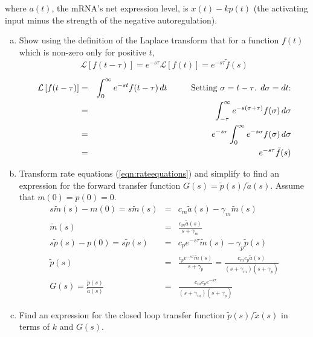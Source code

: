 \documentclass{article}
\begin{document}
\noindent where $a(t)$, the mRNA's net expression level, is $x(t)-k p(t)$ (the activating input minus the strength of the negative autoregulation).

\begin{enumerate}[a)]
\setlength{\itemsep}{0pt}
\item Show using the definition of the Laplace transform that for a function $f(t)$ which is non-zero only for positive $t$,
\[ \mathcal{L}\left[f(t-\tau)\right] = e^{-s\tau} \mathcal{L}\left[f(t)\right] = e^{-s\tau} \tilde{f}(s)\]

{\color{red}
\begin{eqnarray*}
 \mathcal{L}\left[f(t-\tau)\right] & = & \int_0^{\infty} e^{-st} f(t - \tau) \, dt \hspace{1 cm} \textrm{Setting $\sigma = t-\tau$. $d\sigma = dt$:}\\
 & = &  \int_{-\tau}^{\infty} e^{-s(\sigma + \tau)} f(\sigma) \, d\sigma\\
 & = & e^{-s\tau} \int_0^{\infty} e^{-s \sigma} f(\sigma) \, d\sigma\\
 & = & e^{-s\tau} \tilde{f}(s)
\end{eqnarray*}

}

\item Transform rate equations (\ref{eqn:rateequations}) and simplify to find an expression for the forward transfer \linebreak  function $G(s) =\tilde{p}(s)/\tilde{a}(s)$. Assume that $m(0)=p(0)=0$.\\

{\color{red}
\begin{eqnarray*}
s \tilde{m}(s) - m(0) = s \tilde{m}(s) & = & c_m \tilde{a}(s) - \gamma_m \tilde{m}(s)\\
\tilde{m}(s) & = & \frac{c_m \tilde{a}(s)}{s + \gamma_m}\\
s \tilde{p}(s) - p(0) = s \tilde{p}(s) & = & c_p e^{-s\tau} \tilde{m}(s) - \gamma_p \tilde{p}(s)\\
\tilde{p}(s) & = & \frac{c_p e^{-s\tau} \tilde{m}(s)}{s + \gamma_p} = \frac{c_m c_p \tilde{a}(s)}{(s + \gamma_m)(s+\gamma_p)} \\
G(s) = \frac{\tilde{p}(s)}{\tilde{a}(s)} & = & \frac{c_m c_pe^{-s\tau}}{(s + \gamma_m)(s+\gamma_p)} 
\end{eqnarray*}
}

\item Find an expression for the closed loop transfer function $\tilde{p}(s)/\tilde{x}(s)$ in terms of $k$ and $G(s)$.\\



\end{enumerate}
\end{document}
